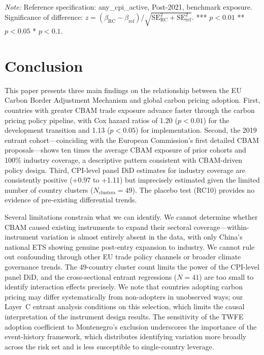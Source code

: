 \documentclass[12pt,a4paper]{article}
\begin{document}
\begin{landscape}
\begin{table}[htbp]
\begin{threeparttable}
\begin{tabular}{llrrrrlrl}
\bottomrule
\end{tabular}
\begin{tablenotes}\small
\item \textit{Note:} Reference specification: any\_cpi\_active, Post-2021, benchmark exposure. Significance of difference: $z = (\beta_{\text{RC}} - \beta_{\text{ref}}) / \sqrt{\text{SE}_{\text{RC}}^2 + \text{SE}_{\text{ref}}^2}$. *** $p<0.01$ ** $p<0.05$ * $p<0.1$.
\end{tablenotes}
\end{threeparttable}
\end{table}
\end{landscape}


\section{Conclusion}\label{sec:conclusion}

This paper presents three main findings on the relationship between the EU Carbon Border Adjustment Mechanism and global carbon pricing adoption. First, countries with greater CBAM trade exposure advance faster through the carbon pricing policy pipeline, with Cox hazard ratios of 1.20 ($p<0.01$) for the development transition and 1.13 ($p<0.05$) for implementation. Second, the 2019 entrant cohort---coinciding with the European Commission's first detailed CBAM proposals---shows ten times the average CBAM exposure of prior cohorts and 100\% industry coverage, a descriptive pattern consistent with CBAM-driven policy design. Third, CPI-level panel DiD estimates for industry coverage are consistently positive (+0.97 to +1.11) but imprecisely estimated given the limited number of country clusters ($N_{\text{clusters}} = 49$). The placebo test (RC10) provides no evidence of pre-existing differential trends.

Several limitations constrain what we can identify. We cannot determine whether CBAM caused existing instruments to expand their sectoral coverage---within-instrument variation is almost entirely absent in the data, with only China's national ETS showing genuine post-entry expansion to industry. We cannot rule out confounding through other EU trade policy channels or broader climate governance trends. The 49-country cluster count limits the power of the CPI-level panel DiD, and the cross-sectional entrant regressions ($N=41$) are too small to identify interaction effects precisely. We note that countries adopting carbon pricing may differ systematically from non-adopters in unobserved ways; our Layer~C entrant analysis conditions on this selection, which limits the causal interpretation of the instrument design results. The sensitivity of the TWFE adoption coefficient to Montenegro's exclusion underscores the importance of the event-history framework, which distributes identifying variation more broadly across the risk set and is less susceptible to single-country leverage.
\end{document}
